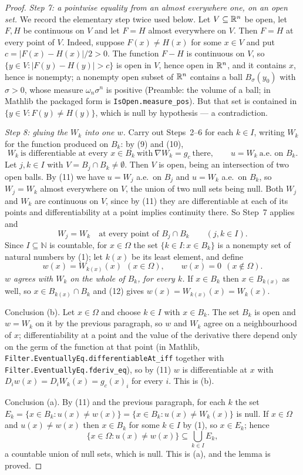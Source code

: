 \begin{proof}
\medskip
\noindent\emph{Step 7: a pointwise equality from an almost everywhere one, on an
open set.}  We record the elementary step twice used below.  Let
$V\subseteq\mathbb{R}^n$ be open, let $F,H$ be continuous on $V$ and let $F=H$ almost
everywhere on $V$.  Then $F=H$ at every point of $V$.  Indeed, suppose
$F(x)\ne H(x)$ for some $x\in V$ and put $c=|F(x)-H(x)|/2>0$.  The function
$F-H$ is continuous on $V$, so $\{y\in V:|F(y)-H(y)|>c\}$ is open in $V$, hence
open in $\mathbb{R}^n$, and it contains $x$, hence is nonempty; a nonempty open subset
of $\mathbb{R}^n$ contains a ball $B_\sigma(y_0)$ with $\sigma>0$, whose measure
$\omega_n\sigma^n$ is positive (Preamble: the volume of a ball; in Mathlib the
packaged form is \texttt{IsOpen.measure\_pos}).  But that set
is contained in $\{y\in V:F(y)\ne H(y)\}$, which is null by hypothesis --- a
contradiction.

\medskip
\noindent\emph{Step 8: gluing the $W_k$ into one $w$.}  Carry out Steps~2--6 for
each $k\in I$, writing $W_k$ for the function produced on $B_k$: by (9) and (10),
\[
W_k\ \text{is differentiable at every }x\in B_k\ \text{with}\ \nabla W_k=g_c
\ \text{there},
\qquad
u=W_k\ \text{a.e.\ on }B_k .
\tag{11}
\]
Let $j,k\in I$ with $V=B_j\cap B_k\ne\emptyset$.  Then $V$ is open, being an
intersection of two open balls.  By (11) we have $u=W_j$ a.e.\ on $B_j$ and
$u=W_k$ a.e.\ on $B_k$, so $W_j=W_k$ almost everywhere on $V$, the union of two
null sets being null.  Both $W_j$ and $W_k$ are continuous on $V$, since by (11)
they are differentiable at each of its points and differentiability at a point
implies continuity there.  So Step~7 applies and
\[
W_j=W_k\quad\text{at every point of }B_j\cap B_k
\qquad(j,k\in I).
\tag{12}
\]
Since $I\subseteq\mathbb N$ is countable, for $x\in\Omega$ the set
$\{k\in I:x\in B_k\}$ is a nonempty set of natural numbers by (1); let $k(x)$ be
its least element, and define
\[
w(x)=W_{k(x)}(x)\ \ (x\in\Omega),
\qquad
w(x)=0\ \ (x\notin\Omega).
\]
\emph{$w$ agrees with $W_k$ on the whole of $B_k$, for every $k$.}  If $x\in B_k$
then $x\in B_{k(x)}$ as well, so $x\in B_{k(x)}\cap B_k$ and (12) gives
$w(x)=W_{k(x)}(x)=W_k(x)$.

Conclusion (b).  Let $x\in\Omega$ and choose $k\in I$ with $x\in B_k$.  The set
$B_k$ is open and $w=W_k$ on it by the previous paragraph, so $w$ and $W_k$
agree on a neighbourhood of $x$; differentiability at a point and the value of
the derivative there depend only on the germ of the function at that point (in
Mathlib, \texttt{Filter.EventuallyEq.differentiableAt\_iff} together with
\texttt{Filter.EventuallyEq.fderiv\_eq}), so
by (11) $w$ is differentiable at $x$ with $D_iw(x)=D_iW_k(x)=g_c(x)_i$ for every
$i$.  This is (b).

Conclusion (a).  By (11) and the previous paragraph, for each $k$ the set
$E_k=\{x\in B_k:u(x)\ne w(x)\}=\{x\in B_k:u(x)\ne W_k(x)\}$ is null.  If
$x\in\Omega$ and $u(x)\ne w(x)$ then $x\in B_k$ for some $k\in I$ by (1), so
$x\in E_k$; hence
\[
\{x\in\Omega:u(x)\ne w(x)\}\subseteq\bigcup_{k\in I}E_k ,
\]
a countable union of null sets, which is null.  This is (a), and the lemma is
proved.
\end{proof}
